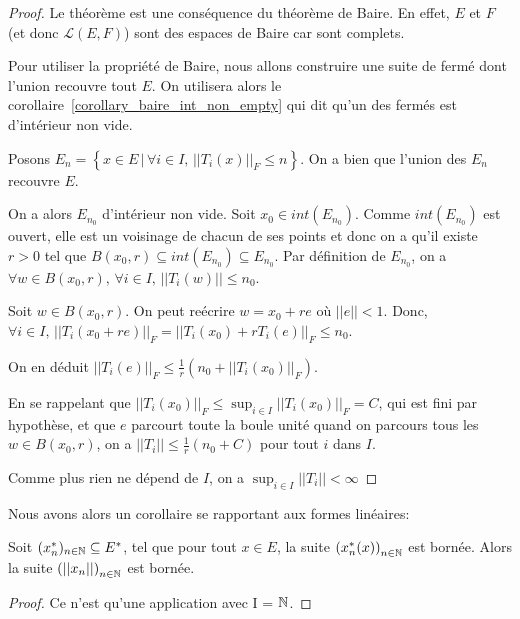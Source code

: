 \ifdefined\outputproof
\begin{proof}
	Le théorème est une conséquence du théorème de Baire. En effet, $E$ et $F$
	(et donc $\mathcal{L}(E, F)$) sont des espaces de Baire car sont complets.

	Pour utiliser la propriété de Baire, nous allons construire une suite de
	fermé dont l'union recouvre tout $E$. On utilisera alors le
	corollaire~\ref{corollary_baire_int_non_empty} qui dit qu'un des fermés est
	d'intérieur non vide.

	Posons $E_{n} = \left\{ x \in E \, | \, \forall i \in I, \, ||T_{i}(x)||_{F}
\leq n \right\}$. On a bien que l'union des $E_{n}$ recouvre $E$.

On a alors $E_{n_{0}}$ d'intérieur non vide. Soit $x_{0} \in int({E_{n_{0}}})$.
Comme $int({E_{n_{0}}})$ est ouvert, elle est un voisinage de chacun de ses
points et donc on a qu'il existe $r > 0$ tel que $B(x_{0}, r)
\subseteq int({E_{n_{0}}}) \subseteq E_{n_{0}}$. Par définition de $E_{n_{0}}$,
on a $\forall w \in B(x_{0}, r), \, \forall i \in I, \, ||T_{i}(w)|| \leq n_{0}$.

	Soit $w \in B(x_{0}, r)$. On peut reécrire $w = x_{0} + r e$ où $||e|| <
	1$. Donc, $\forall i \in I, \, ||T_{i}(x_{0} + re)||_{F} = ||T_{i}(x_{0}) +
	rT_{i}(e)||_{F} \leq n_{0}$. 

	On en déduit $||T_{i}(e)||_{F} \leq \displaystyle \frac{1}{r} (n_{0} +
	||T_{i}(x_{0})||_{F})$.

	En se rappelant que $||T_{i}(x_{0})||_{F} \leq \sup_{i \in I}
	||T_{i}(x_{0})||_{F} = C$, qui est fini par hypothèse, et que $e$ parcourt toute
	la boule unité quand on parcours tous les $w \in B(x_{0}, r)$, on a
	$||T_{i}|| \leq \displaystyle \frac{1}{r} (n_{0} + C)$ pour tout $i$ dans
	$I$.

	Comme plus rien ne dépend de $I$, on a $\sup_{i \in I}||T_{i}|| < \infty$ 
\end{proof}
\fi

Nous avons alors un corollaire se rapportant aux formes linéaires:

\begin{corollary}
	Soit $(x^{*}_{n})_{n \in \mathbb{N}} \subseteq E^{*}$, tel que pour
	tout $x \in E$, la suite ${(x_{n}^{*}(x))}_{n \in \mathbb{N}}$ est bornée. Alors
	la suite ${(||x_{n}||)}_{n \in \mathbb{N}}$ est bornée.
\end{corollary}

\ifdefined\outputproof
\begin{proof}
	Ce n'est qu'une application avec I = $\mathbb{N}$.
\end{proof}
\fi
